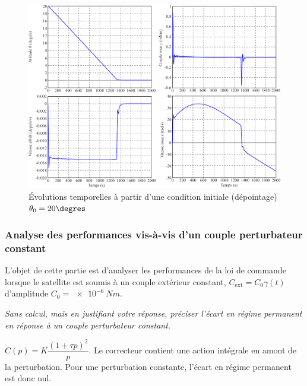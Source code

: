 \ifprof
\else

\begin{figure}[H]
\centering
\includegraphics[width=.8\linewidth]{images/fig_14}
\caption{Évolutions temporelles à partir d’une condition initiale (dépointage) $\theta_0 = 20\degres$ \label{fig_14}}
\end{figure}
\fi

\subsubsection{\label{sec:3:D:3} Analyse des performances vis-à-vis d’un couple perturbateur constant}

L’objet de cette partie est d’analyser les performances de la loi de commande lorsque le satellite est soumis à
un couple extérieur constant, $C_{\text{ext}}= C_0 \gamma(t)$ d’amplitude $C_0 =\SI{e-6}{Nm}$.

\question{\label{q_31}}\textit{Sans calcul, mais en justifiant votre réponse, préciser l’écart en régime permanent en réponse à un couple
perturbateur constant.}
\ifprof
\begin{corrige}
$C(p)=K\dfrac{\left(1+\tau p\right)^2}{p}$. Le correcteur contient une action intégrale en amont de la perturbation. Pour une perturbation constante, l'écart en régime permanent est donc nul.
\end{corrige}
\else
\fi

